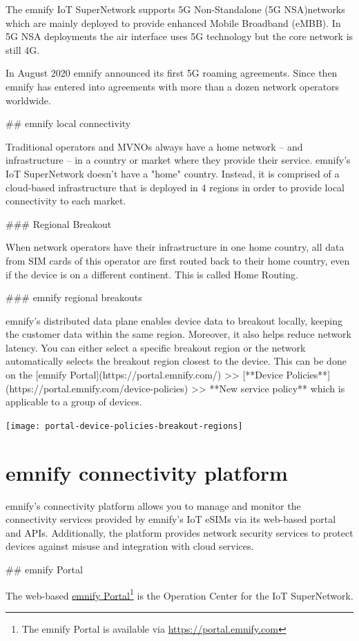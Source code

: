 \documentclass[11pt, oneside]{article}   	%
\newcommand{\addspace}{\vspace{2mm}}
\begin{document}
\begin{markdown}
  The emnify IoT SuperNetwork supports 5G Non-Standalone (5G NSA)networks which are mainly deployed to provide enhanced Mobile Broadband (eMBB).
  In 5G NSA deployments the air interface uses 5G technology but the core network is still 4G.
  
  In August 2020 emnify announced its first 5G roaming agreements.
  Since then emnify has entered into agreements with more than a dozen network operators worldwide.

## emnify local connectivity

Traditional operators and MVNOs always have a home network -- and infrastructure -- in a country or market where they provide their service. 
emnify's IoT SuperNetwork doesn't have a "home" country.
Instead, it is comprised of a cloud-based infrastructure that is deployed in 4 regions in order to provide local connectivity to each market. 

### Regional Breakout 

When network operators have their infrastructure in one home country, all data from SIM cards of this operator are first routed back to their home country, even if the device is on a different continent.
This is called Home Routing.


### emnify regional breakouts

emnify's distributed data plane enables device data to breakout locally, keeping the customer data within the same region.
Moreover, it also helps reduce network latency.
You can either select a specific breakout region or the network automatically selects the breakout region closest to the device.
This can be done on the [emnify Portal](https://portal.emnify.com/) >> [**Device Policies**](https://portal.emnify.com/device-policies) >> **New service policy** which is applicable to a group of devices.

\end{markdown}

\begin{center}
  \addspace
  \texttt{[image: portal-device-policies-breakout-regions]}
\end{center}

\pagebreak[4]

\section{emnify connectivity platform}

\begin{markdown}

emnify's connectivity platform allows you to manage and monitor the connectivity services provided by emnify's IoT eSIMs via its web-based portal and APIs.
Additionally, the platform provides network security services to protect devices against misuse and integration with cloud services.

## emnify Portal

\end{markdown}
The web-based \href{https://portal.emnify.com}{emnify Portal}\footnote{The emnify Portal is available via \href{https://portal.emnify.com}{https://portal.emnify.com}} is the Operation Center for the IoT SuperNetwork.
\end{document}
